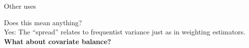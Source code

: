 
\begin{frame}[c]{Other uses}
\centering


Does this mean anything?\\
Yes: The ``spread'' relates to frequentist variance just as in weighting estimators.\\[1em]

{
\textbf{What about covariate balance?}
}

\wholeslidefig{
\AlexanderWeightPlot{}
}

\end{frame}
